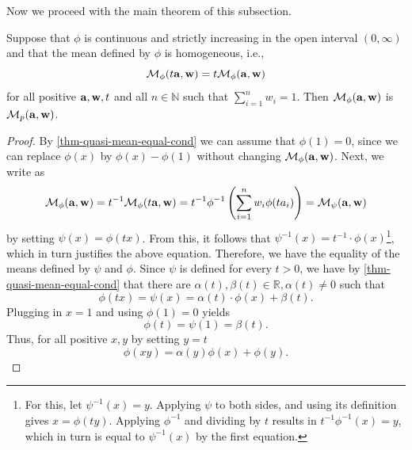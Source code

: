 Now we proceed with the main theorem of this subsection.

\begin{thm} \label{thm-power-mean-uniqueness}
	Suppose that $\phi$ is continuous and strictly increasing in the open interval $(0,\infty)$ and that the mean defined by $\phi$ is homogeneous, i.e.,
  \begin{equation} \label{thm-quasi-homogen-eq}
		\mean{t \ve{a} } = t \mean{\ve{a}}
  \end{equation}
	for all positive $\ve{a}, \ve{w},t$ and all $n \in \mathbb{N}$ such that $\sum_{i=1}^{n} w_i = 1$. Then $\mean{ \ve{a}}$ is $\meanp{\ve{a} }$.

\end{thm}

\begin{proof}
  By \cref{thm-quasi-mean-equal-cond} we can assume that $\phi(1) = 0$, since we can replace $\phi(x)$ by $\phi(x) - \phi(1)$ without changing $\mean{\ve{a}}$. Next, we write  as
  \begin{align*}
    \mean{\ve{a}} = t^{-1} \mean{t\ve{a}} = t^{-1} \phi^{-1} \left ( \sum_{i=1}^{n} w_i \phi(t a_i) \right) = \mean[\psi]{\ve{a}}
  \end{align*}
  by setting $\psi(x) = \phi(t x)$. From this, it follows that $\psi^{-1}(x) = t^{-1} \cdot \phi(x)$\footnote{For this, let $\psi^{-1}(x) = y$. Applying $\psi$ to both sides, and using its definition gives $x = \phi(ty)$. Applying $\phi^{-1}$ and dividing by $t$ results in $t^{-1} \phi^{-1}(x) = y$, which in turn is equal to $\psi^{-1}(x)$ by the first equation.}, which in turn justifies the above equation.
  Therefore, we have the equality of the means defined by $\psi$ and $\phi$. Since $\psi$ is defined for every $t > 0$, we have by \cref{thm-quasi-mean-equal-cond} that there are $\alpha(t), \beta(t) \in \mathbb{R}, \alpha(t) \neq  0$ such that
  \begin{equation*}
  \phi(t x) = \psi(x) = \alpha(t) \cdot \phi(x) + \beta(t).
  \end{equation*}
  Plugging in $x=1$ and using $\phi(1) = 0$ yields
  \begin{equation*}
  \phi(t) = \psi(1) = \beta(t).
  \end{equation*}
  Thus, for all positive $x, y$ by setting $y=t$
  \begin{equation} \label{proof-quasi-eq2}
    \phi(x y) = \alpha(y)\phi(x) + \phi(y).
  \end{equation}

\end{proof}
